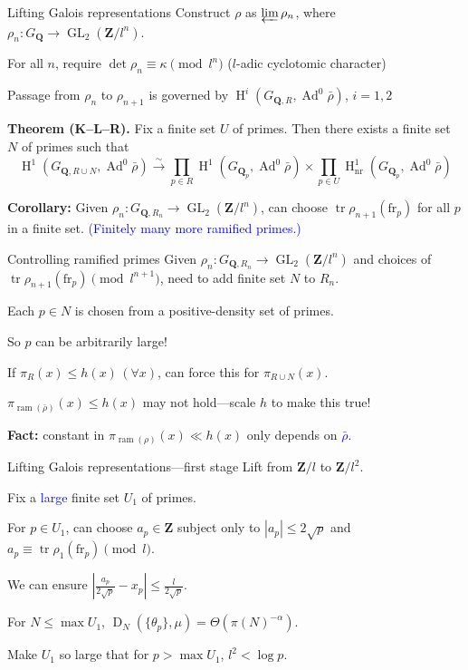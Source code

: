 \documentclass[handout]{beamer}
\DeclareMathOperator{\Ad}{Ad}
\DeclareMathOperator{\D}{D}
\DeclareMathOperator{\GL}{GL}
\DeclareMathOperator{\h}{H}
\DeclareMathOperator{\ram}{ram}
\DeclareMathOperator{\tr}{tr}
\newcommand{\bQ}{\mathbf{Q}}
\newcommand{\bZ}{\mathbf{Z}}
\newcommand{\frob}{\mathrm{fr}}
\begin{document}
\begin{frame}{Lifting Galois representations}
Construct $\rho$ as $\varprojlim \rho_n$, where 
$\rho_n\colon G_\bQ \to \GL_2(\bZ/l^n)$.
\pause

For all $n$, require $\det\rho_n \equiv \kappa\pmod{l^n}$
\pause
($l$-adic cyclotomic character)
\pause

Passage from $\rho_n$ to $\rho_{n+1}$ is governed by 
$\h^i(G_{\bQ,R},\Ad^0\bar\rho)$, $i = 1,2$
\pause

\textbf{Theorem (K--L--R).}
Fix a finite set $U$ of primes. Then there exists a finite set $N$ of primes 
such that 
\[
	\h^1(G_{\bQ,R\cup N},\Ad^0\bar\rho) \xrightarrow{\sim}\prod_{p\in R} \h^1(G_{\bQ_p}, \Ad^0\bar\rho) \times \prod_{p\in U} \h_\mathrm{nr}^1(G_{\bQ_p},\Ad^0\bar\rho)
\]
\pause

\textbf{Corollary:}
Given $\rho_n\colon G_{\bQ,R_n} \to \GL_2(\bZ/l^n)$, can choose 
$\tr\rho_{n+1}(\frob_p)$ for all $p$ in a finite set.
\pause
\textcolor{blue}{(Finitely many more ramified primes.)}
\end{frame}


\begin{frame}{Controlling ramified primes}
Given $\rho_n\colon G_{\bQ,R_n} \to \GL_2(\bZ/l^n)$ and choices of 
$\tr \rho_{n+1}(\frob_p)\pmod{l^{n+1}}$, need to add finite set $N$ to 
$R_n$. 
\pause

Each $p\in N$ is chosen from a positive-density set of primes.
\pause

So $p$ can be arbitrarily large!
\pause

If $\pi_R(x) \leqslant h(x)\,(\forall x)$, can force this for 
$\pi_{R\cup N}(x)$. 
\pause

$\pi_{\ram(\bar\rho)}(x)\leqslant h(x)$ may not hold---scale $h$ to make this 
true!
\pause

\textbf{Fact:} constant in $\pi_{\ram(\rho)}(x) \ll h(x)$ only depends on 
\textcolor{blue}{$\bar\rho$}. 
\end{frame}


\begin{frame}{Lifting Galois representations---first stage}
Lift from $\bZ/l$ to $\bZ/l^2$. 
\pause

Fix a \textcolor{blue}{large} finite set $U_1$ of primes. 
\pause

For $p\in U_1$, can choose $a_p\in \bZ$ subject only to 
$|a_p|\leqslant 2\sqrt p$ and $a_p\equiv \tr\rho_1(\frob_p)\pmod{l}$. 
\pause

We can ensure 
$\left| \frac{a_p}{2\sqrt p} - x_p\right| \leqslant \frac{l}{2\sqrt p}$.
\pause

For $N\leqslant \max U_1$, $\D_N(\{\theta_p\},\mu) = \Theta(\pi(N)^{-\alpha})$. 
\pause

Make $U_1$ so large that for $p>\max U_1$, $l^2 < \log p$. 
\end{frame}
\end{document}
